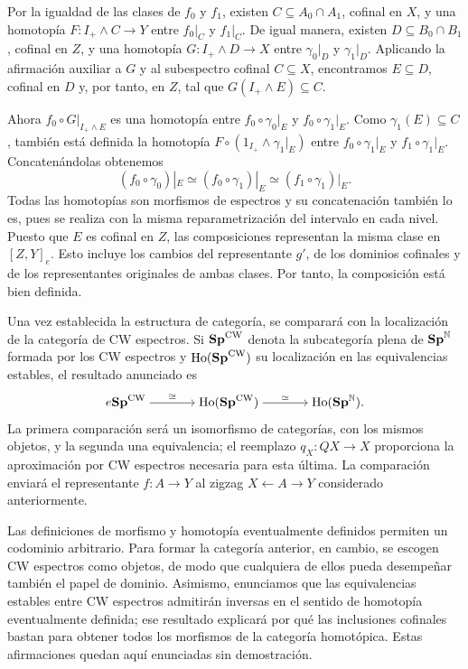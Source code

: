 \begin{sol}
Por la igualdad de las clases de $f_0$ y $f_1$, existen $C\subseteq A_0\cap A_1$, cofinal en $X$, y una homotopía $F\colon I_+\wedge C\to Y$ entre $f_0|_C$ y $f_1|_C$. De igual manera, existen $D\subseteq B_0\cap B_1$, cofinal en $Z$, y una homotopía $G\colon I_+\wedge D\to X$ entre $\gamma_0|_D$ y $\gamma_1|_D$. Aplicando la afirmación auxiliar a $G$ y al subespectro cofinal $C\subseteq X$, encontramos $E\subseteq D$, cofinal en $D$ y, por tanto, en $Z$, tal que $G(I_+\wedge E)\subseteq C$.

Ahora $f_0\circ G|_{I_+\wedge E}$ es una homotopía entre $f_0\circ\gamma_0|_E$ y $f_0\circ\gamma_1|_E$. Como $\gamma_1(E)\subseteq C$, también está definida la homotopía $F\circ(1_{I_+}\wedge\gamma_1|_E)$ entre $f_0\circ\gamma_1|_E$ y $f_1\circ\gamma_1|_E$. Concatenándolas obtenemos
\[
(f_0\circ\gamma_0)|_E\simeq(f_0\circ\gamma_1)|_E
\simeq(f_1\circ\gamma_1)|_E.
\]
Todas las homotopías son morfismos de espectros y su concatenación también lo es, pues se realiza con la misma reparametrización del intervalo en cada nivel. Puesto que $E$ es cofinal en $Z$, las composiciones representan la misma clase en $[Z,Y]_e$. Esto incluye los cambios del representante $g'$, de los dominios cofinales y de los representantes originales de ambas clases. Por tanto, la composición está bien definida. \qedhere
\end{sol}

Una vez establecida la estructura de categoría, se comparará con la localización de la categoría de CW espectros. Si $\mathbf{Sp}^{\mathrm{CW}}$ denota la subcategoría plena de $\mathbf{Sp}^{\mathbb N}$ formada por los CW espectros y $\operatorname{Ho}(\mathbf{Sp}^{\mathrm{CW}})$ su localización en las equivalencias estables, el resultado anunciado es
\[
\begin{tikzcd}[cramped,column sep=large]
e\Sp^{\mathrm{CW}} \arrow[r,"\cong"]
& \operatorname{Ho}(\Sp^{\mathrm{CW}}) \arrow[r,"\simeq"]
& \operatorname{Ho}(\Sp^{\mathbb N}).
\end{tikzcd}
\]
La primera comparación será un isomorfismo de categorías, con los mismos objetos, y la segunda una equivalencia; el reemplazo $q_X\colon QX\to X$ proporciona la aproximación por CW espectros necesaria para esta última. La comparación enviará el representante $f\colon A\to Y$ al zigzag $X\leftarrow A\to Y$ considerado anteriormente.

Las definiciones de morfismo y homotopía eventualmente definidos permiten un codominio arbitrario. Para formar la categoría anterior, en cambio, se escogen CW espectros como objetos, de modo que cualquiera de ellos pueda desempeñar también el papel de dominio. Asimismo, enunciamos que las equivalencias estables entre CW espectros admitirán inversas en el sentido de homotopía eventualmente definida; ese resultado explicará por qué las inclusiones cofinales bastan para obtener todos los morfismos de la categoría homotópica. Estas afirmaciones quedan aquí enunciadas sin demostración.
